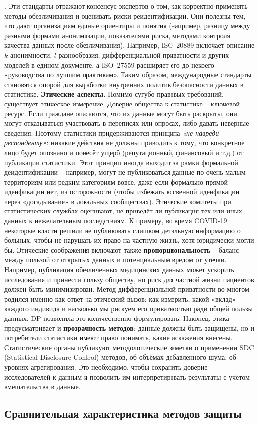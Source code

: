 . Эти стандарты отражают консенсус экспертов о том, как корректно применять методы обезличивания и оценивать риски реидентификации. Они полезны тем, что дают организациям единые ориентиры и понятия (например, разницу между разными формами анонимизации, показателями риска, методами контроля качества данных после обезличивания). Например, ISO 20889 включает описание $k$-анонимности, $l$-разнообразия, дифференциальной приватности и других моделей в едином документе, а ISO 27559 расширяет его до некоего «руководства по лучшим практикам». Таким образом, международные стандарты становятся опорой для выработки внутренних политик безопасности данных в статистике. \textbf{Этические аспекты.} Помимо сугубо правовых требований, существует этическое измерение. Доверие общества к статистике – ключевой ресурс. Если граждане опасаются, что их данные могут быть раскрыты, они могут отказываться участвовать в переписях или опросах, либо давать неверные сведения. Поэтому статистики придерживаются принципа \textit{«не навреди респонденту»}: никакие действия не должны приводить к тому, что конкретное лицо будет опознано и понесёт ущерб (репутационный, финансовый и т.д.) от публикации статистики. Этот принцип иногда выходит за рамки формальной деидентификации – например, могут не публиковаться данные по очень малым территориям или редким категориям вовсе, даже если формально прямой иденфикации нет, из осторожности (чтобы избежать косвенной иденфикации через «догадывание» в локальных сообществах). Этические комитеты при статистических службах оценивают, не приведёт ли публикация тех или иных данных к нежелательным последствиям. К примеру, во время COVID-19 некоторые власти решили не публиковать слишком детальную информацию о больных, чтобы не нарушать их право на частную жизнь, хотя юридически могли бы. Этические соображения включают также \textbf{пропорциональность} – баланс между пользой от открытых данных и потенциальным вредом от утечки. Например, публикация обезличенных медицинских данных может ускорить исследования и принести пользу обществу, но риск для частной жизни пациентов должен быть минимизирован. Метод дифференциальной приватности во многом родился именно как ответ на этический вызов: как измерить, какой «вклад» каждого индивида и насколько мы рискуем его приватностью ради общей пользы данных. DP позволила это количественно формулировать. Наконец, этика предусматривает и \textbf{прозрачность методов}: данные должны быть защищены, но и потребители статистики имеют право понимать, какие искажения внесены. Статистические органы публикуют методологические заметки о применении SDC (Statistical Disclosure Control) методов, об объёмах добавленного шума, об уровнях агрегирования. Это необходимо, чтобы сохранить доверие исследователей к данным и позволить им интерпретировать результаты с учётом вмешательства в данные. \subsection{Сравнительная характеристика методов защиты}

